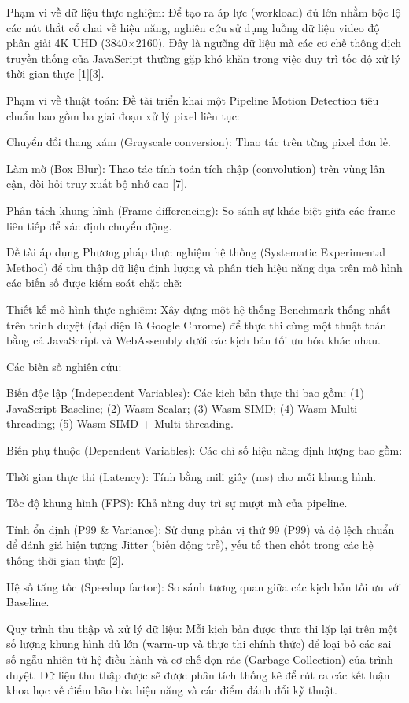 Phạm vi về dữ liệu thực nghiệm: Để tạo ra áp lực (workload) đủ lớn nhằm bộc lộ các nút thắt cổ chai về hiệu năng, nghiên cứu sử dụng luồng dữ liệu video độ phân giải 4K UHD (3840×2160). Đây là ngưỡng dữ liệu mà các cơ chế thông dịch truyền thống của JavaScript thường gặp khó khăn trong việc duy trì tốc độ xử lý thời gian thực [1][3].


Phạm vi về thuật toán: Đề tài triển khai một Pipeline Motion Detection tiêu chuẩn bao gồm ba giai đoạn xử lý pixel liên tục:


Chuyển đổi thang xám (Grayscale conversion): Thao tác trên từng pixel đơn lẻ.


Làm mờ (Box Blur): Thao tác tính toán tích chập (convolution) trên vùng lân cận, đòi hỏi truy xuất bộ nhớ cao [7].


Phân tách khung hình (Frame differencing): So sánh sự khác biệt giữa các frame liên tiếp để xác định chuyển động.



Đề tài áp dụng Phương pháp thực nghiệm hệ thống (Systematic Experimental Method) để thu thập dữ liệu định lượng và phân tích hiệu năng dựa trên mô hình các biến số được kiểm soát chặt chẽ:


Thiết kế mô hình thực nghiệm: Xây dựng một hệ thống Benchmark thống nhất trên trình duyệt (đại diện là Google Chrome) để thực thi cùng một thuật toán bằng cả JavaScript và WebAssembly dưới các kịch bản tối ưu hóa khác nhau.


Các biến số nghiên cứu:


Biến độc lập (Independent Variables): Các kịch bản thực thi bao gồm: (1) JavaScript Baseline; (2) Wasm Scalar; (3) Wasm SIMD; (4) Wasm Multi-threading; (5) Wasm SIMD + Multi-threading.


Biến phụ thuộc (Dependent Variables): Các chỉ số hiệu năng định lượng bao gồm:


Thời gian thực thi (Latency): Tính bằng mili giây (ms) cho mỗi khung hình.


Tốc độ khung hình (FPS): Khả năng duy trì sự mượt mà của pipeline.


Tính ổn định (P99 \& Variance): Sử dụng phân vị thứ 99 (P99) và độ lệch chuẩn để đánh giá hiện tượng Jitter (biến động trễ), yếu tố then chốt trong các hệ thống thời gian thực [2].


Hệ số tăng tốc (Speedup factor): So sánh tương quan giữa các kịch bản tối ưu với Baseline.


Quy trình thu thập và xử lý dữ liệu: Mỗi kịch bản được thực thi lặp lại trên một số lượng khung hình đủ lớn (warm-up và thực thi chính thức) để loại bỏ các sai số ngẫu nhiên từ hệ điều hành và cơ chế dọn rác (Garbage Collection) của trình duyệt. Dữ liệu thu thập được sẽ được phân tích thống kê để rút ra các kết luận khoa học về điểm bão hòa hiệu năng và các điểm đánh đổi kỹ thuật.


